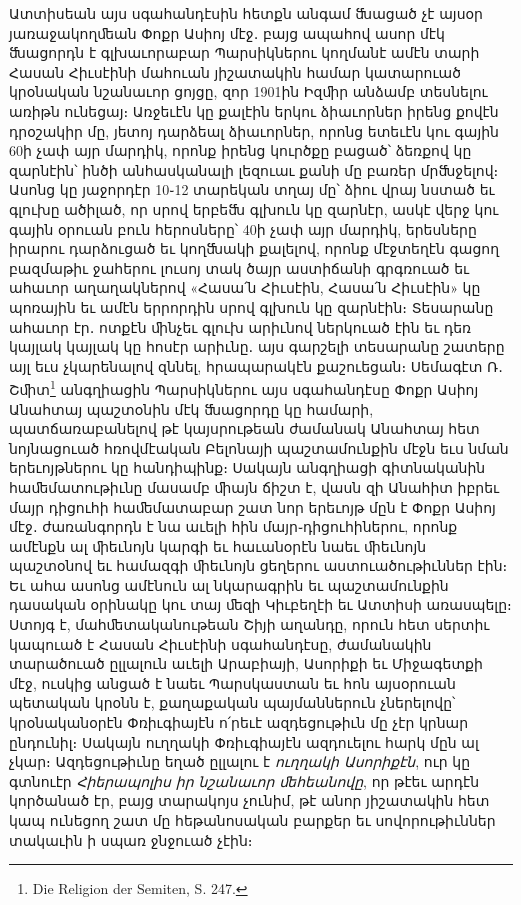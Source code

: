 \documentclass{article}
\begin{document}
{Ատտիսեան այս սգահանդէսին հետքն անգամ ﬓացած չէ այսօր յառաջակողﬔան Փոքր Ասիոյ մէջ․ բայց ապահով ասոր մէկ ﬓացորդն է գլխաւորաբար Պարսիկներու կողմանէ ամէն տարի Հասան Հիւսէինի մահուան յիշատակին համար կատարուած կրօնական նշանաւոր ցոյցը, զոր 1901ին Իզﬕր անձամբ տեսնելու առիթն ունեցայ։ Առջեւէն կը քալէին երկու ձիաւորներ իրենց քովէն դրօշակիր մը, յետոյ դարձեալ ձիաւորներ, որոնց ետեւէն կու գային 60ի չափ այր մարդիկ, որոնք իրենց կուրծքը բացած՝ ձեռքով կը զարնէին՝ ինծի անհասկանալի լեզուաւ քանի մը բառեր մրﬓջելով։ Ասոնց կը յաջորդէր 10֊12 տարեկան տղայ մը՝ ձիու վրայ նստած եւ գլուխը ածիլած, որ սրով երբեﬓ գլխուն կը զարնէր, ասկէ վերջ կու գային օրուան բուն հերոսները՝ 40ի չափ այր մարդիկ, երեսները իրարու դարձուցած եւ կողﬓակի քալելով, որոնք մէջտեղէն գացող բազմաթիւ ջահերու լուսոյ տակ ծայր աստիճանի գրգռուած եւ ահաւոր աղաղակներով «Հասա՛ն Հիւսէին, Հասա՛ն Հիւսէին» կը պոռային եւ ամէն երրորդին սրով գլխուն կը զարնէին։ Տեսարանը ահաւոր էր․ ոտքէն ﬕնչեւ գլուխ արիւնով ներկուած էին եւ դեռ կայլակ կայլակ կը հոսէր արիւնը․ այս գարշելի տեսարանը շատերը այլ եւս չկարենալով զննել, հրապարակէն քաշուեցան։ Սեմագէտ Ռ․ Շﬕտ\footnote{Die Religion der Semiten, S. 247.} անգղիացին Պարսիկներու այս սգահանդէսը Փոքր Ասիոյ Անահտայ պաշտօնին մէկ ﬓացորդը կը համարի, պատճառաբանելով թէ կայսրութեան ժամանակ Անահտայ հետ նոյնացուած հռովմէական Բելոնայի պաշտամունքին մէջն եւս նման երեւոյթներու կը հանդիպինք։ Սակայն անգղիացի գիտնականին հաﬔմատութիւնը մասամբ ﬕայն ճիշտ է, վասն զի Անահիտ իբրեւ մայր դիցուհի հաﬔմատաբար շատ նոր երեւոյթ մըն է Փոքր Ասիոյ մէջ․ ժառանգորդն է նա աւելի հին մայր֊դիցուհիներու, որոնք ամէնքն ալ ﬕեւնոյն կարգի եւ հաւանօրէն նաեւ ﬕեւնոյն պաշտօնով եւ համազգի ﬕեւնոյն ցեղերու աստուածութիւններ էին։ Եւ ահա ասոնց ամէնուն ալ նկարագրին եւ պաշտամունքին դասական օրինակը կու տայ ﬔզի Կիւբեղէի եւ Ատտիսի առասպելը։ Ստոյգ է, մահﬔտականութեան Շիյի աղանդը, որուն հետ սերտիւ կապուած է Հասան Հիւսէինի սգահանդէսը, ժամանակին տարածուած ըլլալուն աւելի Արաբիայի, Ասորիքի եւ Միջագետքի մէջ, ուսկից անցած է նաեւ Պարսկաստան եւ հոն այսօրուան պետական կրօնն է, քաղաքական պայմաններուն չներելովը՝ կրօնականօրէն Փռիւգիայէն ո՛րեւէ ազդեցութիւն մը չէր կրնար ընդունիլ։ Սակայն ուղղակի Փռիւգիայէն ազդուելու հարկ մըն ալ չկար։ Ազդեցութիւնը եղած ըլլալու է \emph{ուղղակի Ասորիքէն}, ուր կը գտնուէր \emph{Հիերապոլիս իր նշանաւոր ﬔհեանովը}, որ թէեւ արդէն կործանած էր, բայց տարակոյս չունիմ, թէ անոր յիշատակին հետ կապ ունեցող շատ մը հեթանոսական բարքեր եւ սովորութիւններ տակաւին ի սպառ ջնջուած չէին։

}
\end{document}
